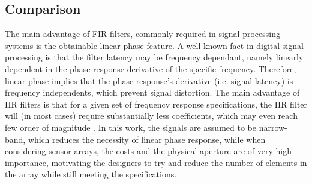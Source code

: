 \subsection{Comparison}
The main advantage of FIR filters, commonly required in signal processing systems is the obtainable linear phase feature. A well known \cite{oppenheim1975digital} fact in digital signal processing is that the filter latency may be frequency dependant, namely linearly dependent in the phase response derivative of the specific frequency.
Therefore, linear phase implies that the phase response's derivative (i.e. signal latency) is frequency independents, which prevent signal distortion.
The main advantage of IIR filters is that for a given set of frequency response specifications, the IIR filter will (in most cases) require substantially less coefficients, which may even reach few order of magnitude \cite{rabiner1974some}.
In this work, the signals are assumed to be narrow-band, which reduces the necessity of linear phase response, while when considering sensor arrays, the costs and the physical aperture are of very high importance, motivating the designers to try and reduce the number of elements in the array while still meeting the specifications.